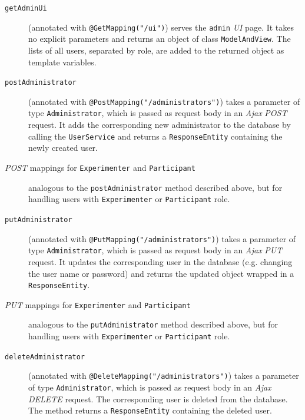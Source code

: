 \documentclass[a4paper]{usiinfbachelorproject}
\begin{document}
    \begin{description}

        \item[\texttt{getAdminUi}]
        (annotated with \texttt{@GetMapping("/ui")}) serves the \texttt{admin} \emph{UI} page. It takes no explicit parameters and returns an object
        of class \texttt{ModelAndView}. The lists of all users, separated by role, are added to the returned object as template variables.

        \item[\texttt{postAdministrator}]
        (annotated with \texttt{@PostMapping("/administrators")}) takes a parameter of type \texttt{Administrator},
        which is passed as request body in an \emph{Ajax} \emph{POST} request. It adds
        the corresponding new administrator to the database by calling the \texttt{UserService} and returns a \texttt{ResponseEntity}
        containing the newly created user. 

        \item[\emph{POST} mappings for \texttt{Experimenter} and \texttt{Participant}] analogous to the \texttt{postAdministrator} method
        described above, but for handling users with \texttt{Experimenter} or \texttt{Participant} role.

        \item[\texttt{putAdministrator}] 
        (annotated with \texttt{@PutMapping("/administrators")}) takes a parameter of type \texttt{Administrator},
        which is passed as request body in an \emph{Ajax} \emph{PUT} request. It updates the corresponding
        user in the database (e.g. changing the user name or password) and returns the updated object wrapped
        in a \texttt{ResponseEntity}.

        \item[\emph{PUT} mappings for \texttt{Experimenter} and \texttt{Participant}] analogous to  the \texttt{putAdministrator} method
        described above, but for handling users with \texttt{Experimenter} or \texttt{Participant} role.

        \item[\texttt{deleteAdministrator}]
        (annotated with \texttt{@DeleteMapping("/administrators")}) takes a parameter of type \texttt{Administrator},
        which is passed as request body in an \emph{Ajax} \emph{DELETE} request. The corresponding user is
        deleted from the database. The method returns a \texttt{ResponseEntity} containing the deleted user.


\end{description}
\end{document}
